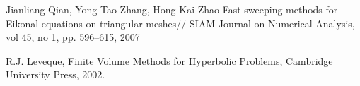 \begin{thebibliography}{99}
 {Jianliang Qian, Yong-Tao Zhang, Hong-Kai Zhao} Fast
  sweeping methods for Eikonal equations on triangular meshes// SIAM
  Journal on Numerical Analysis, vol 45, no 1, pp. 596–615, 2007
  

 {R.J. Leveque}, Finite Volume Methods for Hyperbolic Problems, Cambridge
University Press, 2002.


  
\end{thebibliography}


